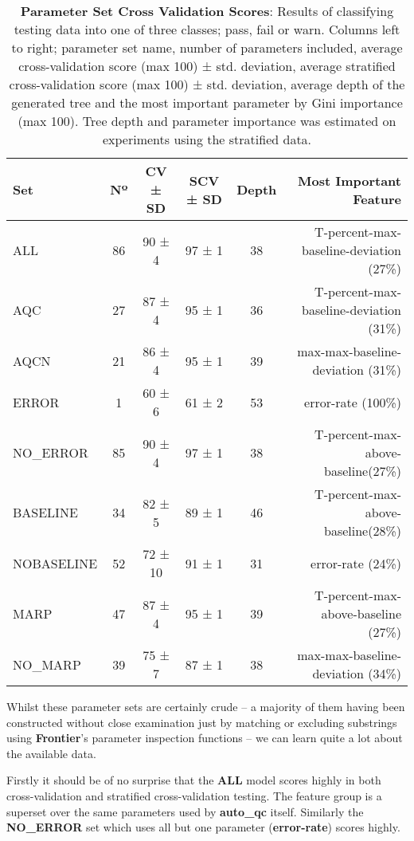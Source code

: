 \begin{table}[H]
    \centering
    \begin{tabular}{l | c  c  c  c  r}
        Set           & Nº & CV ± SD & SCV ± SD & Depth & Most Important Feature\\
        \hline
        ALL           & 86 & 90 ± 4 & 97 ± 1 & 38 & T-percent-max-baseline-deviation (27\%)\\
        AQC           & 27 & 87 ± 4 & 95 ± 1 & 36 & T-percent-max-baseline-deviation (31\%)\\
        AQCN          & 21 & 86 ± 4 & 95 ± 1 & 39 & max-max-baseline-deviation (31\%)\\
        ERROR         & 1  & 60 ± 6 & 61 ± 2 & 53 & error-rate (100\%)\\
        NO\_ERROR     & 85 & 90 ± 4 & 97 ± 1 & 38 & T-percent-max-above-baseline(27\%)\\
        BASELINE      & 34 & 82 ± 5 & 89 ± 1 & 46 & T-percent-max-above-baseline(28\%)\\
        NOBASELINE    & 52 & 72 ± 10 & 91 ± 1 & 31 & error-rate (24\%)\\
        MARP          & 47 & 87 ± 4 & 95 ± 1 & 39 & T-percent-max-above-baseline (27\%)\\
        NO\_MARP      & 39 & 75 ± 7 & 87 ± 1 & 38 & max-max-baseline-deviation (34\%)\\
    \end{tabular}

    \caption[pset-cv]{\textbf{Parameter Set Cross Validation Scores}: Results of
        classifying testing data into one of three classes; pass, fail or warn.
        Columns left to right; parameter set name, number of parameters
        included, average cross-validation score (max 100) ± std. deviation,
        average stratified cross-validation score (max 100) ± std. deviation,
        average depth of the generated tree and the most important parameter by
        Gini importance (max 100). Tree depth and parameter importance was
    estimated on experiments using the stratified data.}

    \label{tab:pset-cv}
\end{table}

Whilst these parameter sets are certainly crude -- a majority of them having
been constructed without close examination just by matching or excluding
substrings using \textbf{Frontier}'s parameter inspection functions -- we can
learn quite a lot about the available data.

Firstly it should be of no surprise that the \textbf{ALL} model scores highly in
both cross-validation and stratified cross-validation testing. The feature group
is a superset over the same parameters used by \textbf{auto\_qc} itself.
Similarly the \textbf{NO\_ERROR} set which uses all but one parameter
(\textbf{error-rate}) scores highly.

